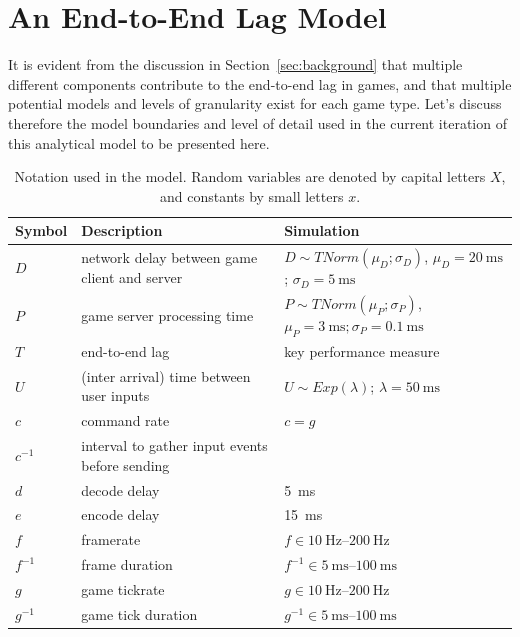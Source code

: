 \section{An End-to-End Lag Model}
\label{sec:model}

It is evident from the discussion in Section~\ref{sec:background} that multiple different components contribute to the end-to-end lag in games, and that multiple potential models and levels of granularity exist for each game type. Let's discuss therefore the model boundaries and level of detail used in the current iteration of this analytical model to be presented here.


\begin{table}[!t]
\caption{Notation used in the model. Random variables are denoted by capital letters $X$, and constants by small letters $x$.}
\label{tab:notation}
	\centering
	\begin{tabu}{lX[1,l]X[1,l]}
	\toprule
	\textbf{Symbol} & \textbf{Description} & \textbf{Simulation} \\
	\midrule
	$D$ & network delay between game client and server & $D \sim TNorm(\mu_D;\sigma_D)$, $\mu_D = \SI{20}{\milli\second}$; $\sigma_D = \SI{5}{\milli\second}$\\
	$P$ & game server processing time & $P \sim TNorm(\mu_P;\sigma_P)$, $ \mu_P = \SI{3}{\milli\second}; \sigma_P = \SI{0.1}{\milli\second}$\\
	$T$ & end-to-end lag & key performance measure \\
	$U$ & (inter arrival) time between user inputs & $U \sim Exp(\lambda)$; $\lambda = \SI{50}{\milli\second}$\\
	\midrule
	$c$ & command rate & $c=g$ \\
	$c^{-1}$ & interval to gather input events before sending & \\
	$d$ & decode delay & \SI{5}{\milli\second} \\
	$e$ & encode delay & \SI{15}{\milli\second} \\
	$f$ & framerate & $f \in \SIrange{10}{200}{\hertz}$ \\
	$f^{-1}$ & frame duration & $f^{-1} \in \SIrange{5}{100}{\milli\second}$ \\
	$g$ & game tickrate & $g \in \SIrange{10}{200}{\hertz}$ \\
	$g^{-1}$ & game tick duration & $g^{-1} \in \SIrange{5}{100}{\milli\second}$ \\
	\bottomrule
	\end{tabu}
\end{table}


